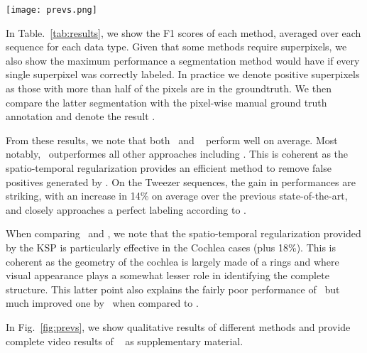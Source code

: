 \begin{figure*}[t]
\caption{Qualitative results for each type. From left to right: Original image with groundtruth highlighted in red and 2D location in green, output of foreground prediction model (SSnnPU), SSnnPU combined with our spatio-temporal regularization scheme (SSnnPU+KSPTrack), best baseline (KSPTrack), and second best baseline (EEL).}
\centering
    \texttt{[image: prevs.png]}
\label{fig:prevs}
\end{figure*}

In Table.~\ref{tab:results}, we show the F1 scores of each method, averaged over each sequence for each data type. Given that some methods require superpixels, we also show the maximum performance a segmentation method would have if every single superpixel was correctly labeled. In practice we denote positive superpixels as those with more than half of the pixels are in the groundtruth. We then compare the latter segmentation with the pixel-wise manual ground truth annotation and denote the result \MaxSP.

From these results, we note that both \SSnnPU~and \SSnnPUKSP~ perform well on average. Most notably, \SSnnPUKSP~outperformes all other approaches including \SSnnPU. This is coherent as the spatio-temporal regularization provides an efficient method to remove false positives generated by \SSnnPU. On the Tweezer sequences, the gain in performances are striking, with an increase in 14\% on average over the previous state-of-the-art, and closely approaches a perfect labeling according to \MaxSP.

When comparing \SSnnPU~and \SSnnPUKSP, we note that the spatio-temporal regularization provided by the KSP is particularly effective in the Cochlea cases (\ie plus 18\%). This is coherent as the geometry of the cochlea is largely made of a rings and where visual appearance plays a somewhat lesser role in identifying the complete structure. This latter point also explains the fairly poor performance of \SSnnPU~but much improved one by \SSnnPUKSP~when compared to \KSPTrack. 

In Fig.~\ref{fig:prevs}, we show qualitative results of different methods and provide complete video results of \SSnnPUKSP~ as supplementary material.

